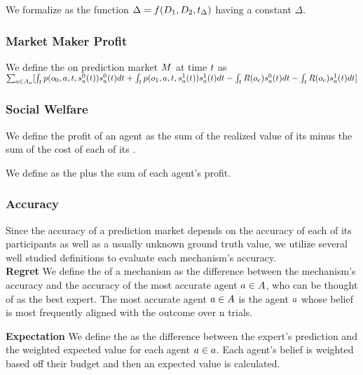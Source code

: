 We formalize  as the function $\Delta = f(D_{1},D_{2},t_{\Delta})$
having a constant $\Delta$.\\

\subsubsection{Market Maker Profit}
We define the  on prediction market $M$ at time $t$ as\\
$\sum_{a\in A_o} [
\int_{t} 
p(o_0,a,t, s^{0}_{a}(t))s^{0}_{a}(t)dt
+\int_{t} 
p(o_1,a,t, s^{1}_{a}(t))s^{1}_{a}(t)dt
-\int_{t} 
R(o_e)s^{0}_{a}(t)dt
-\int_{t}
R(o_e)s^{1}_{a}(t)dt]$

\subsubsection{Social Welfare}
We define the profit of an agent as the sum of the realized value of its  minus the
sum of the cost of each of its .

We define  as the  plus the sum of each agent's profit.

\subsubsection{Accuracy}
Since the accuracy of a prediction market depends on the accuracy of each of its participants
as well as a usually unknown ground truth value, we utilize several well studied definitions
to evaluate each mechanism's accuracy.\\

\textbf{Regret}
We define the  of a mechanism as the difference between the mechanism's accuracy
and the accuracy of the most accurate agent $a\in A$, who can be thought of as the
best expert. The most accurate agent $a\in A$ is the agent $a$ whose belief is
most frequently aligned with the outcome over n trials.

\textbf{Expectation}
We define the  as the difference between the expert's prediction
and the weighted expected value for each agent $a\in a$. Each agent's belief is weighted
based off their budget and then an expected value is calculated.

